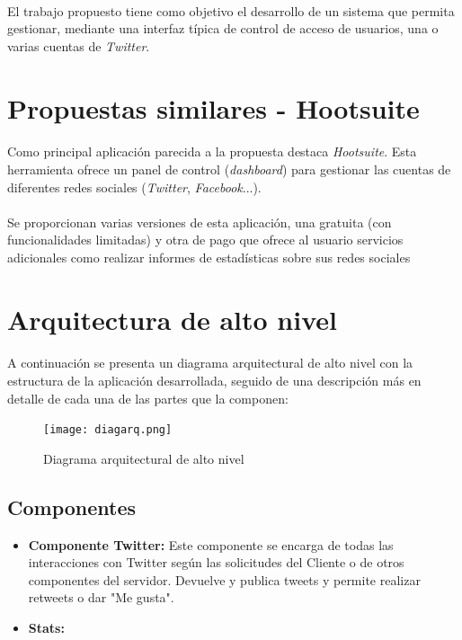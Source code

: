 \documentclass[a4paper]{article}
\begin{document}
	\paragraph{} El trabajo propuesto tiene como objetivo el desarrollo de un sistema que permita gestionar, mediante una interfaz típica de control de acceso de usuarios, una o varias cuentas de \textit{Twitter}.

\section{Propuestas similares - Hootsuite}

	\paragraph{} Como principal aplicación parecida a la propuesta destaca \textit{Hootsuite}. Esta herramienta ofrece un panel de control (\textit{dashboard}) para gestionar las cuentas de diferentes redes sociales (\textit{Twitter}, \textit{Facebook}...).
	
	\paragraph{} Se proporcionan varias versiones de esta aplicación, una gratuita (con funcionalidades limitadas) y otra de pago que ofrece al usuario servicios adicionales como realizar informes de estadísticas sobre sus redes sociales

\section{Arquitectura de alto nivel}
	\paragraph{} A continuación se presenta un diagrama arquitectural de alto nivel con la estructura de la aplicación desarrollada, seguido de una descripción más en detalle de cada una de las partes que la componen:
	\begin{figure}[H]
		\centering
		\texttt{[image: diagarq.png]}
		\caption{Diagrama arquitectural de alto nivel}
		\label{fig:diagarq}
	\end{figure}
	\newpage
	\subsection{Componentes}
		\begin{itemize}
			\item \textbf{Componente Twitter:} Este componente se encarga de todas las interacciones con Twitter según las solicitudes del Cliente o de otros componentes del servidor. Devuelve y publica tweets y permite realizar retweets o dar "Me gusta".
			\item \textbf{Stats:}
		\end{itemize}
\end{document}
